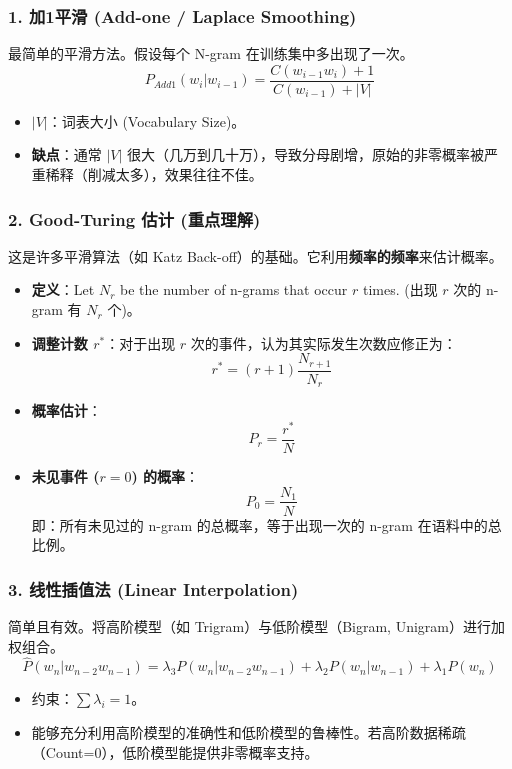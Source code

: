 \documentclass[a4paper, 11pt]{ctexart}
\begin{document}
\subsubsection{1. 加1平滑 (Add-one / Laplace Smoothing)}
最简单的平滑方法。假设每个 N-gram 在训练集中多出现了一次。
\begin{equation}
    P_{Add1}(w_i | w_{i-1}) = \frac{C(w_{i-1} w_i) + 1}{C(w_{i-1}) + |V|}
\end{equation}
\begin{itemize}
    \item $|V|$：词表大小 (Vocabulary Size)。
    \item \textbf{缺点}：通常 $|V|$ 很大（几万到几十万），导致分母剧增，原始的非零概率被严重稀释（削减太多），效果往往不佳。
\end{itemize}

\subsubsection{2. Good-Turing 估计 (重点理解)}
这是许多平滑算法（如 Katz Back-off）的基础。它利用\textbf{频率的频率}来估计概率。
\begin{itemize}
    \item \textbf{定义}：Let $N_r$ be the number of n-grams that occur $r$ times. (出现 $r$ 次的 n-gram 有 $N_r$ 个)。
    \item \textbf{调整计数 $r^*$}：对于出现 $r$ 次的事件，认为其实际发生次数应修正为：
    \begin{equation}
        r^* = (r+1) \frac{N_{r+1}}{N_r}
    \end{equation}
    \item \textbf{概率估计}：
    $$ P_r = \frac{r^*}{N} $$
    \item \textbf{未见事件 ($r=0$) 的概率}：
    $$ P_0 = \frac{N_1}{N} $$
    即：所有未见过的 n-gram 的总概率，等于出现一次的 n-gram 在语料中的总比例。
\end{itemize}

\subsubsection{3. 线性插值法 (Linear Interpolation)}
简单且有效。将高阶模型（如 Trigram）与低阶模型（Bigram, Unigram）进行加权组合。
\begin{equation}
    \hat{P}(w_n|w_{n-2}w_{n-1}) = \lambda_3 P(w_n|w_{n-2}w_{n-1}) + \lambda_2 P(w_n|w_{n-1}) + \lambda_1 P(w_n)
\end{equation}
\begin{itemize}
    \item 约束：$\sum \lambda_i = 1$。
    \item 能够充分利用高阶模型的准确性和低阶模型的鲁棒性。若高阶数据稀疏（Count=0），低阶模型能提供非零概率支持。
\end{itemize}
\end{document}
